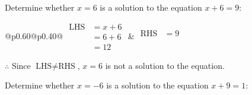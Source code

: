 \documentclass[12pt]{article}
\newcounter{minipagecount}
\begin{document}
\begin{multicols}{2}
\begin{minipage}[t]{0.40\textwidth}
    \noindent Determine whether \(x = 6\) is a solution to the equation \(x + 6 = 9\):
    \vspace{2pt}  %

    \noindent
    \renewcommand{\arraystretch}{1.3} %
    \begin{tabular}{@{}p{0.60\linewidth}@{}p{0.40\linewidth}@{}}
        \(\begin{aligned}
            \text{LHS} &= x + 6 \\
                    &= 6 + 6 \\
                    &= 12 
        \end{aligned}\) &
        \(\begin{aligned}
            \text{RHS} &= 9\\
                    & \\
                    &
        \end{aligned}\)
    \end{tabular}
    \renewcommand{\arraystretch}{1.0} %
    \vspace{2pt}  %

    \noindent \(\therefore\) Since \(\text{LHS} \neq \text{RHS}\), \(x = 6\) is not  a solution to the equation.

\end{minipage}

\vspace*{0.5ex}
\vfill{}
\noindent{(\theminipagecount)}\hspace{0.1mm} %
\begin{minipage}[t]{0.40\textwidth} %

    \noindent Determine whether \(x = -6\) is a solution to the equation \(x + 9 = 1\):
    \vspace{2pt}  %


\end{minipage}
\end{multicols}
\end{document}
